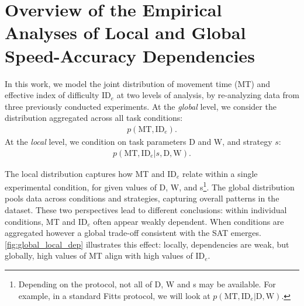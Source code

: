 \documentclass[acmlarge, manuscript,review]{acmart}
\newcommand{\mt}{\ensuremath{{\text{MT}}}\xspace}
\newcommand{\ide}{\ensuremath{{\text{ID}_e}}\xspace}
\newcommand{\D}{\ensuremath{{\text{D}}}\xspace}
\newcommand{\W}{\ensuremath{{\text{W}}}\xspace}
\begin{document}



\section{Overview of the Empirical Analyses of Local and Global Speed-Accuracy Dependencies\label{sec:outline}}
In this work, we model the joint distribution of movement time (MT) and effective index of difficulty \ide at two levels of analysis, by re-analyzing data from three previously conducted experiments.
At the \emph{global} level, we consider the distribution aggregated across all task conditions:
\begin{align}
	p(\mt, \ide). \label{eq:joint_global}
\end{align}
At the \emph{local} level, we condition on task parameters D and W, and strategy $s$:
\begin{align}
	p(\mt, \ide | s, \D, \W). \label{eq:joint_local}
\end{align}

The local distribution captures how MT and \ide relate within a single experimental condition, for given values of D, W, and s\footnote{Depending on the protocol, not all of D, W and s may be available. For example, in a standard Fitts protocol, we will look at $p(\mt, \ide | \D, \W)$.}. 
The global distribution pools data across conditions and strategies, capturing overall patterns in the dataset. 
These two perspectives lead to different conclusions: within individual conditions, MT and \ide often appear weakly dependent. 
When conditions are aggregated however a global trade-off consistent with the SAT emerges. 
\autoref{fig:global_local_dep} illustrates this effect: locally, dependencies are weak, but globally, high values of MT align with high values of \ide. 
\end{document}
